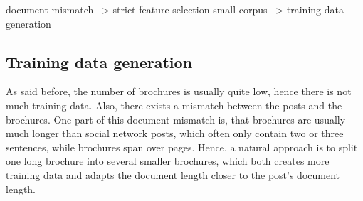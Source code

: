 document mismatch --> strict feature selection
small corpus --> training data generation


\subsection{Training data generation}

As said before, the number of brochures is usually quite low, hence there is not much training data.
Also, there exists a mismatch between the posts and the brochures.
One part of this document mismatch is, that brochures are usually much longer than social network posts, which often only contain two or three sentences, while brochures span over pages.
Hence, a natural approach is to split one long brochure into several smaller brochures, which both creates more training data and adapts the document length closer to the post's document length.


